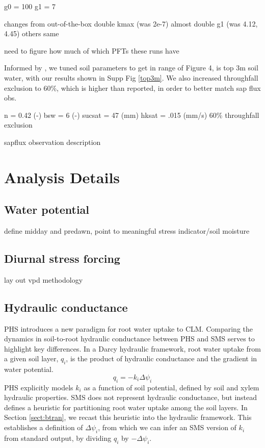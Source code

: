 \documentclass[draft,linenumbers]{agujournal}
\begin{document}
g0 = 100
g1 = 7

changes from out-of-the-box
double kmax (was 2e-7)
almost double g1 (was 4.12, 4.45)
others same

need to figure how much of which PFTs these runs have

Informed by \cite{fisher2008}, we tuned soil parameters to get in range of 
\cite{fisher2007} Figure 4, is top 3m soil water, with our results shown in Supp Fig \ref{top3m}.
We also increased throughfall exclusion to 60\%, which is higher than reported, in order to better match sap flux obs.

n = 0.42 (-)
bsw = 6 (-)
sucsat = 47 (mm)
hksat = .015 (mm/s)
60\% throughfall exclusion

sapflux observation description


\section{Analysis Details}  
\subsection{Water potential}

define midday and predawn, point to meaningful stress indicator/soil moisture

\subsection{Diurnal stress forcing}
lay out vpd methodology

\subsection{Hydraulic conductance}
PHS introduces a new paradigm for root water uptake to CLM.
Comparing the dynamics in soil-to-root hydraulic conductance between PHS and SMS serves to highlight key differences.
In a Darcy hydraulic framework, root water uptake from a given soil layer, $q_i$, is the product of hydraulic conductance and the gradient in water potential.
\begin{equation}
q_i = -k_i\Delta\psi_i
\end{equation}
PHS explicitly models $k_i$ as a function of soil potential, defined by soil and xylem hydraulic properties.
SMS does not represent hydraulic conductance, but instead defines a heuristic for partitioning root water uptake among the soil layers.
In Section \ref{sect:btran}, we recast this heuristic into the hydraulic framework.
This establishes a definition of $\Delta\psi_i$, from which we can infer an SMS version of $k_i$ from standard output, by dividing $q_i$ by $-\Delta\psi_i$.
\end{document}
